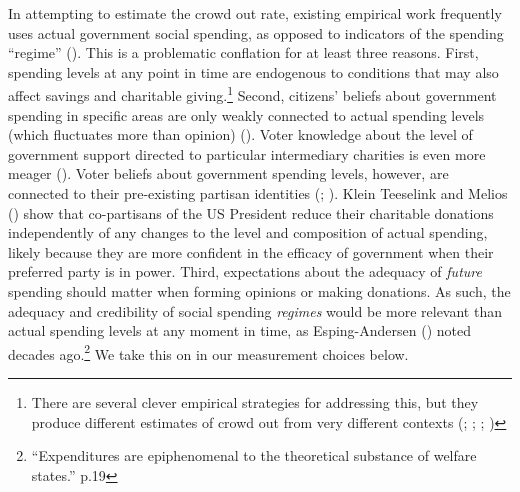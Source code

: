 \documentclass[
  11pt,
  oneside]{article}
\begin{document}
In attempting to estimate the crowd out rate, existing empirical work frequently uses actual government social spending, as opposed to indicators of the spending ``regime'' (). This is a problematic conflation for at least three reasons. First, spending levels at any point in time are endogenous to conditions that may also affect savings and charitable giving.\footnote{There are several clever empirical strategies for addressing this, but they produce different estimates of crowd out from very different contexts (; ; ; )} Second, citizens' beliefs about government spending in specific areas are only weakly connected to actual spending levels (which fluctuates more than opinion) (). Voter knowledge about the level of government support directed to particular intermediary charities is even more meager (). Voter beliefs about government spending levels, however, are connected to their pre-existing partisan identities (; ). Klein Teeselink and Melios () show that co-partisans of the US President reduce their charitable donations independently of any changes to the level and composition of actual spending, likely because they are more confident in the efficacy of government when their preferred party is in power. Third, expectations about the adequacy of \emph{future} spending should matter when forming opinions or making donations. As such, the adequacy and credibility of social spending \emph{regimes} would be more relevant than actual spending levels at any moment in time, as Esping-Andersen () noted decades ago.\footnote{``Expenditures are epiphenomenal to the theoretical substance of welfare states.'' p.19} We take this on in our measurement choices below.
\end{document}
